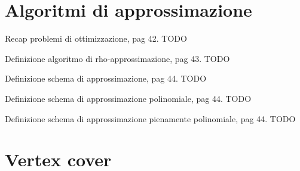 \section{Algoritmi di approssimazione}

Recap problemi di ottimizzazione, pag 42.
TODO

Definizione algoritmo di rho-approssimazione, pag 43.
TODO

Definizione schema di approssimazione, pag 44.
TODO

Definizione schema di approssimazione polinomiale, pag 44.
TODO

Definizione schema di approssimazione pienamente polinomiale, pag 44.
TODO

\section{Vertex cover}
